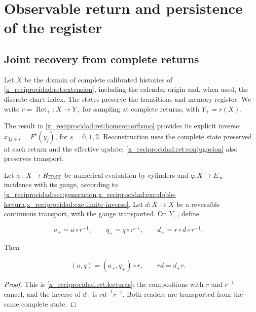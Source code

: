 \chapter{Observable return and persistence of the register}
\label{x_reciprocidad:nuclear:9}
\section{Joint recovery from complete returns}

Let \(X\) be the domain of complete calibrated histories of
\cref{x_reciprocidad:ret:extension}, including the calendar origin and, when
used, the discrete chart index. The states preserve the
transitions and memory register. We write
\(r=\operatorname{Ret}_+:X\to Y_+\) for sampling at complete
returns, with \(Y_+=r(X)\).

The result in \cref{x_reciprocidad:ret:homeomorfismo} provides its explicit inverse: \(x_{3j+s}=F^s(y_j)\), for \(s=0,1,2\). Reconstruction uses the complete state preserved at each return and the effective update; \eqref{x_reciprocidad:ret:conjugacion} also preserves transport.

Let \(a:X\to R_{\rm HMT}\) be numerical evaluation by cylinders and \(q:X\to E_\infty\) incidence with its gauge, according to \cref{x_reciprocidad:sec:generacion,x_reciprocidad:exc:doble-lectura,x_reciprocidad:exc:limite-inverso}. Let \(d:X\to X\) be a reversible continuous transport, with the gauge transported. On \(Y_+\), define



\[
a_+=a\circ r^{-1},\qquad q_+=q\circ r^{-1},\qquad d_+=r\circ d\circ r^{-1}.
\]



Then



\begin{equation}
\boxed{(a,q)=(a_+,q_+)\circ r,\qquad rd=d_+r.}
\label{x_reciprocidad:nuc09:lecturas}
\end{equation}



\begin{proof}
This is \cref{x_reciprocidad:ret:lecturas}: the compositions with \(r\) and \(r^{-1}\) cancel, and the inverse of \(d_+\) is \(rd^{-1}r^{-1}\). Both readers are transported from the same complete state.
\end{proof}

